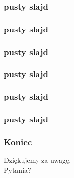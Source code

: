 \documentclass{beamer}
\begin{document}

\begin{frame}
\frametitle{pusty slajd}

\end{frame}


\begin{frame}
\frametitle{pusty slajd}

\end{frame}


\begin{frame}
\frametitle{pusty slajd}

\end{frame}


\begin{frame}
\frametitle{pusty slajd}

\end{frame}


\begin{frame}
\frametitle{pusty slajd}

\end{frame}


\begin{frame}
\frametitle{pusty slajd}

\end{frame}


\begin{frame}
\frametitle{Koniec}

\begin{block}{}
Dziękujemy za uwagę.\\
Pytania?
\end{block}


\end{frame}

\end{document}
